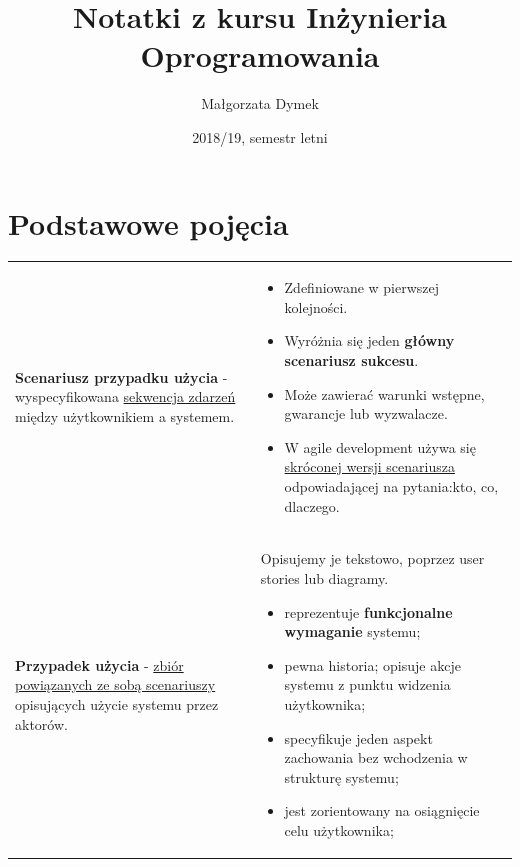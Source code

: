 \documentclass[a4paper]{article}
\title{Notatki z kursu Inżynieria Oprogramowania}
\author{Małgorzata Dymek}
\date{2018/19, semestr letni}
\begin{document}
    \maketitle

    \section{Podstawowe pojęcia}
    \begin{table}[H]
        \begin{center}
            \begin{tabular}{  p{6cm} p{10cm}  }

                \textbf{Scenariusz przypadku użycia} - wyspecyfikowana \underline{sekwencja zdarzeń} między użytkownikiem a systemem.
                &
                \begin{itemize}
                    \item Zdefiniowane w pierwszej kolejności.
                    \item Wyróżnia się jeden \textbf{główny scenariusz sukcesu}.
                    \item Może zawierać warunki wstępne, gwarancje lub wyzwalacze.
                    \item W agile development używa się \underline{skróconej wersji scenariusza} odpowiadającej
                    na pytania:kto, co, dlaczego.
                \end{itemize}
                \\

                \cmidrule(r){1-1}\cmidrule(l){2-2}

                \textbf{Przypadek użycia} - \underline{zbiór powiązanych ze sobą scenariuszy} opisujących użycie systemu przez aktorów.
                &
                Opisujemy je tekstowo, poprzez user stories lub diagramy.
                \begin{itemize}
                    \item reprezentuje \textbf{funkcjonalne wymaganie} systemu;
                    \item pewna historia; opisuje akcje systemu z punktu widzenia użytkownika;
                    \item specyfikuje jeden aspekt zachowania bez wchodzenia w strukturę systemu;
                    \item jest zorientowany na osiągnięcie celu użytkownika;
                \end{itemize}
                \\

            \end{tabular}
        \end{center}
    \end{table}
\end{document}
